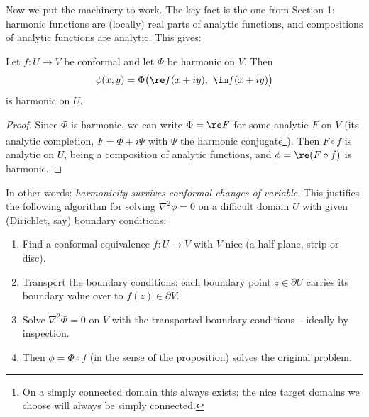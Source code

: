 Now we put the machinery to work. The key fact is the one from Section 1: harmonic functions are (locally) real parts of analytic functions, and compositions of analytic functions are analytic. This gives:

\begin{proposition}
	Let $f : U \to V$ be conformal and let $\Phi$ be harmonic on $V$. Then
	$$
	\phi(x, y) = \Phi\big(\re f(x + iy),\ \im f(x + iy)\big)
	$$
	is harmonic on $U$.
\end{proposition}
\begin{proof}
	Since $\Phi$ is harmonic, we can write $\Phi = \re F$ for some analytic $F$ on $V$ (its analytic completion, $F = \Phi + i\Psi$ with $\Psi$ the harmonic conjugate\footnote{On a simply connected domain this always exists; the nice target domains we choose will always be simply connected.}). Then $F \circ f$ is analytic on $U$, being a composition of analytic functions, and $\phi = \re(F \circ f)$ is harmonic.
\end{proof}

In other words: \emph{harmonicity survives conformal changes of variable}. This justifies the following algorithm for solving $\nabla^2 \phi = 0$ on a difficult domain $U$ with given (Dirichlet, say) boundary conditions:
\begin{enumerate}
	\item Find a conformal equivalence $f : U \to V$ with $V$ nice (a half-plane, strip or disc).
	\item Transport the boundary conditions: each boundary point $z \in \partial U$ carries its boundary value over to $f(z) \in \partial V$.
	\item Solve $\nabla^2 \Phi = 0$ on $V$ with the transported boundary conditions -- ideally by inspection.
	\item Then $\phi = \Phi \circ f$ (in the sense of the proposition) solves the original problem.
\end{enumerate}


